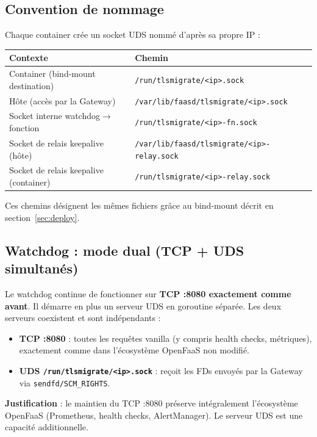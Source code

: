 \documentclass[11pt,a4paper]{article}
\begin{document}
\subsection{Convention de nommage}

Chaque container crée un socket UDS nommé d'après sa propre IP :

\begin{center}
\begin{tabular}{ll}
\toprule
\textbf{Contexte} & \textbf{Chemin} \\
\midrule
Container (bind-mount destination) & \texttt{/run/tlsmigrate/<ip>.sock} \\
Hôte (accès par la Gateway) & \texttt{/var/lib/faasd/tlsmigrate/<ip>.sock} \\
Socket interne watchdog$\to$fonction & \texttt{/run/tlsmigrate/<ip>-fn.sock} \\
Socket de relais keepalive (hôte) & \texttt{/var/lib/faasd/tlsmigrate/<ip>-relay.sock} \\
Socket de relais keepalive (container) & \texttt{/run/tlsmigrate/<ip>-relay.sock} \\
\bottomrule
\end{tabular}
\end{center}

Ces chemins désignent les mêmes fichiers grâce au bind-mount décrit en section~\ref{sec:deploy}.

\subsection{Watchdog : mode dual (TCP + UDS simultanés)}

Le watchdog continue de fonctionner sur \textbf{TCP :8080 exactement comme avant}.
Il démarre en plus un serveur UDS en goroutine séparée.
Les deux serveurs coexistent et sont indépendants :

\begin{itemize}
  \item \textbf{TCP :8080} : toutes les requêtes vanilla (y compris health checks, métriques),
    exactement comme dans l'écosystème OpenFaaS non modifié.
  \item \textbf{UDS \texttt{/run/tlsmigrate/<ip>.sock}} : reçoit les FDs envoyés par la Gateway
    via \texttt{sendfd/SCM\_RIGHTS}.
\end{itemize}

\textbf{Justification} : le maintien du TCP :8080 préserve intégralement l'écosystème OpenFaaS
(Prometheus, health checks, AlertManager). Le serveur UDS est une capacité additionnelle.
\end{document}
